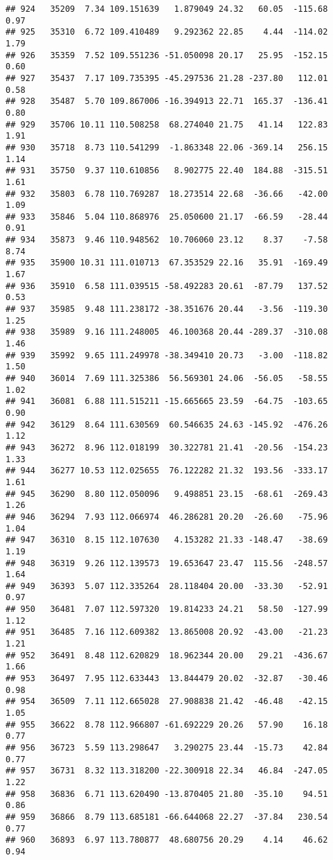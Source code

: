 \documentclass[]{article}
\begin{document}
\begin{verbatim}
## 924   35209  7.34 109.151639   1.879049 24.32   60.05  -115.68  0.97
## 925   35310  6.72 109.410489   9.292362 22.85    4.44  -114.02  1.79
## 926   35359  7.52 109.551236 -51.050098 20.17   25.95  -152.15  0.60
## 927   35437  7.17 109.735395 -45.297536 21.28 -237.80   112.01  0.58
## 928   35487  5.70 109.867006 -16.394913 22.71  165.37  -136.41  0.80
## 929   35706 10.11 110.508258  68.274040 21.75   41.14   122.83  1.91
## 930   35718  8.73 110.541299  -1.863348 22.06 -369.14   256.15  1.14
## 931   35750  9.37 110.610856   8.902775 22.40  184.88  -315.51  1.61
## 932   35803  6.78 110.769287  18.273514 22.68  -36.66   -42.00  1.09
## 933   35846  5.04 110.868976  25.050600 21.17  -66.59   -28.44  0.91
## 934   35873  9.46 110.948562  10.706060 23.12    8.37    -7.58  8.74
## 935   35900 10.31 111.010713  67.353529 22.16   35.91  -169.49  1.67
## 936   35910  6.58 111.039515 -58.492283 20.61  -87.79   137.52  0.53
## 937   35985  9.48 111.238172 -38.351676 20.44   -3.56  -119.30  1.25
## 938   35989  9.16 111.248005  46.100368 20.44 -289.37  -310.08  1.46
## 939   35992  9.65 111.249978 -38.349410 20.73   -3.00  -118.82  1.50
## 940   36014  7.69 111.325386  56.569301 24.06  -56.05   -58.55  1.02
## 941   36081  6.88 111.515211 -15.665665 23.59  -64.75  -103.65  0.90
## 942   36129  8.64 111.630569  60.546635 24.63 -145.92  -476.26  1.12
## 943   36272  8.96 112.018199  30.322781 21.41  -20.56  -154.23  1.33
## 944   36277 10.53 112.025655  76.122282 21.32  193.56  -333.17  1.61
## 945   36290  8.80 112.050096   9.498851 23.15  -68.61  -269.43  1.26
## 946   36294  7.93 112.066974  46.286281 20.20  -26.60   -75.96  1.04
## 947   36310  8.15 112.107630   4.153282 21.33 -148.47   -38.69  1.19
## 948   36319  9.26 112.139573  19.653647 23.47  115.56  -248.57  1.64
## 949   36393  5.07 112.335264  28.118404 20.00  -33.30   -52.91  0.97
## 950   36481  7.07 112.597320  19.814233 24.21   58.50  -127.99  1.12
## 951   36485  7.16 112.609382  13.865008 20.92  -43.00   -21.23  1.21
## 952   36491  8.48 112.620829  18.962344 20.00   29.21  -436.67  1.66
## 953   36497  7.95 112.633443  13.844479 20.02  -32.87   -30.46  0.98
## 954   36509  7.11 112.665028  27.908838 21.42  -46.48   -42.15  1.05
## 955   36622  8.78 112.966807 -61.692229 20.26   57.90    16.18  0.77
## 956   36723  5.59 113.298647   3.290275 23.44  -15.73    42.84  0.77
## 957   36731  8.32 113.318200 -22.300918 22.34   46.84  -247.05  1.22
## 958   36836  6.71 113.620490 -13.870405 21.80  -35.10    94.51  0.86
## 959   36866  8.79 113.685181 -66.644068 22.27  -37.84   230.54  0.77
## 960   36893  6.97 113.780877  48.680756 20.29    4.14    46.62  0.94

\end{verbatim}
\end{document}
